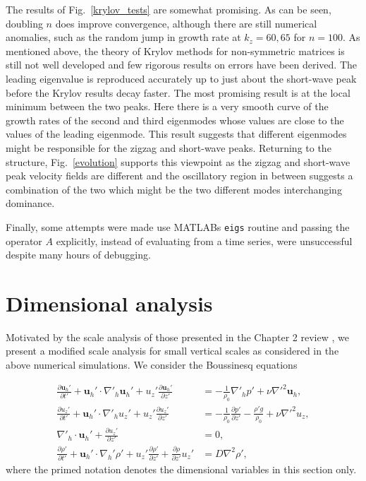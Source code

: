 The results of Fig.~\ref{krylov_tests} are somewhat promising. As can be seen, doubling $n$ does improve convergence, although there are still numerical anomalies, such as the random jump in growth rate at $k_{z}=60,65$ for $n=100$. As mentioned above, the theory of Krylov methods for non-symmetric matrices is still not well developed and few rigorous results on errors have been derived. The leading eigenvalue is reproduced accurately up to just about the short-wave peak before the Krylov results decay faster. The most promising result is at the local minimum between the two peaks. Here there is a very smooth curve of the growth rates of the second and third eigenmodes whose values are close to the values of the leading eigenmode. This result suggests that different eigenmodes might be responsible for the zigzag and short-wave peaks. Returning to the structure, Fig.~\ref{evolution} supports this viewpoint as the zigzag and short-wave peak velocity fields are different and the oscillatory region in between suggests a combination of the two which might be the two different modes interchanging dominance. 

Finally, some attempts were made use MATLABs \texttt{eigs} routine and passing the operator $A$ explicitly, instead of evaluating from a time series, were unsuccessful despite many hours of debugging. 

\section{Dimensional analysis}
Motivated by the scale analysis of those presented in the Chapter 2 review \cite{lilly1983,rileylelong2000,bc2001,brethouwer2007}, we present a modified scale analysis for small vertical scales as considered in the above numerical simulations. We consider the Boussinesq equations

\begin{align}
\frac{\partial \bm{u}_{h}'}{\partial t'} + \bm{u}_{h}'\cdot\nabla'_{h}\bm{u}_{h}'+u_{z}'\frac{\partial \bm{u}_{h}'}{\partial z'} &= -\frac{1}{\rho_{0}}\nabla'_{h}p' + \nu \nabla'^{2}\bm{u}_{h}\label{scaling_horz},\\
\frac{\partial u_{z}'}{\partial t'} + \bm{u}_{h}'\cdot\nabla'_{h}u_{z}'+u_{z}'\frac{\partial u_{z}'}{\partial z'} &= -\frac{1}{\rho_{0}}\frac{\partial p'}{\partial z'} - \frac{\rho' g}{\rho_{0}} + \nu \nabla'^{2}u_{z},\label{scaling_vert}\\
\nabla'_{h}\cdot\bm{u}_{h}' + \frac{\partial u_{z}'}{\partial z'} &=0,\label{scaling_cont}\\
\frac{\partial \rho'}{\partial t'} + \bm{u}_{h}'\cdot\nabla_{h}'\rho' + u_{z}'\frac{\partial \rho'}{\partial z'} + \frac{\partial \rho}{\partial z'}u_{z}'&=D\nabla^{2}\rho ',\label{scaling_moment}
\end{align}
where the primed notation denotes the dimensional variables in this section only. 

